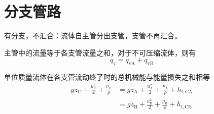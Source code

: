 \documentclass{book}
\begin{document}
\section{分支管路}

有分支，不汇合：流体自主管分出支管，支管不再汇合。

主管中的流量等于各支管流量之和，对于不可压缩流体，则有
\begin{equation}
q_\mathrm{v} = q_\mathrm{vA} + q_\mathrm{vB}
\label{eq:branch-pipe-flow}
\end{equation}

单位质量流体在各支管流动终了时的总机械能与能量损失之和相等
\begin{equation}
\begin{aligned}
gz_\mathrm{C} + \frac{u^2_\mathrm{C}}{2} + \frac{p_\mathrm{C}}{\rho}
&= gz_\mathrm{A} + \frac{u^2_\mathrm{A}}{2} + \frac{p_\mathrm{A}}{\rho} + h_\mathrm{f,CA} \\
&= gz_\mathrm{B} + \frac{u^2_\mathrm{B}}{2} + \frac{p_\mathrm{B}}{\rho} + h_\mathrm{f,CB}
\end{aligned}
\label{eq:branch-pipe-mech}
\end{equation}
\end{document}
